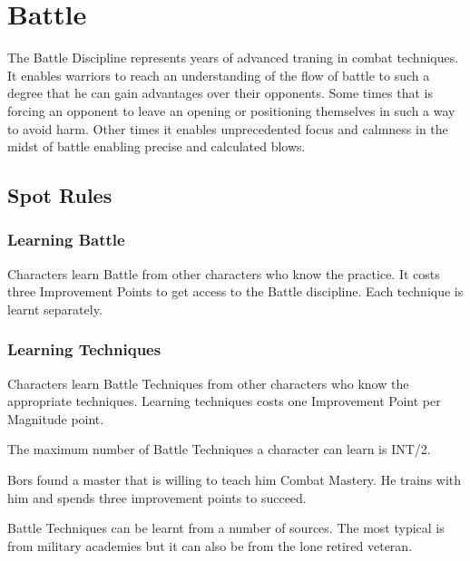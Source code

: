 \chapter{Battle}
\label{ch:battle}

The Battle Discipline represents years of advanced traning in combat techniques. It enables warriors to reach an understanding of the flow of battle to such a degree that he can gain advantages over their opponents. Some times that is forcing an opponent to leave an opening or positioning themselves in such a way to avoid harm. Other times it enables unprecedented focus and calmness in the midst of battle enabling precise and calculated blows.


\section{Spot Rules}

\subsection{Learning Battle}
Characters learn Battle from other characters who know the practice. It costs three Improvement Points to get access to the Battle discipline. Each technique is learnt separately.

\subsection{Learning Techniques}
Characters learn Battle Techniques from other characters who know the appropriate techniques. Learning techniques costs one Improvement Point per Magnitude point. 

The maximum number of Battle Techniques a character can learn is INT/2.

\begin{rpg-examplebox}
Bors found a master that is willing to teach him Combat Mastery. He trains with him and spends three improvement points to succeed. 
\end{rpg-examplebox}

Battle Techniques can be learnt from a number of sources. The most typical is from military academies but it can also be from the lone retired veteran. 

